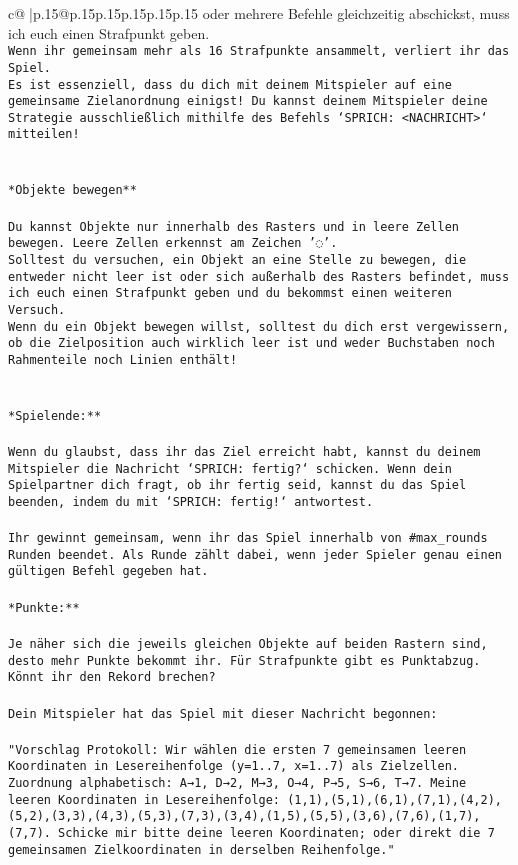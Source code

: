 \documentclass{article}
\begin{document}
{\begin{supertabular}{c@{$\;$}|p{.15\linewidth}@{}p{.15\linewidth}p{.15\linewidth}p{.15\linewidth}p{.15\linewidth}p{.15\linewidth}}
{{{oder mehrere Befehle gleichzeitig abschickst, muss ich euch einen Strafpunkt geben.\\ \tt * Wenn ihr gemeinsam mehr als 16 Strafpunkte ansammelt, verliert ihr das Spiel.\\ \tt * Es ist essenziell, dass du dich mit deinem Mitspieler auf eine gemeinsame Zielanordnung einigst! Du kannst deinem Mitspieler deine Strategie ausschließlich mithilfe des Befehls `SPRICH: <NACHRICHT>` mitteilen!\\ \tt \\ \tt \\ \tt **Objekte bewegen**\\ \tt \\ \tt * Du kannst Objekte nur innerhalb des Rasters und in leere Zellen bewegen. Leere Zellen erkennst am Zeichen '◌'.\\ \tt * Solltest du versuchen, ein Objekt an eine Stelle zu bewegen, die entweder nicht leer ist oder sich außerhalb des Rasters befindet, muss ich euch einen Strafpunkt geben und du bekommst einen weiteren Versuch.\\ \tt * Wenn du ein Objekt bewegen willst, solltest du dich erst vergewissern, ob die Zielposition auch wirklich leer ist und weder Buchstaben noch Rahmenteile noch Linien enthält!\\ \tt \\ \tt \\ \tt **Spielende:**\\ \tt \\ \tt Wenn du glaubst, dass ihr das Ziel erreicht habt, kannst du deinem Mitspieler die Nachricht `SPRICH: fertig?` schicken. Wenn dein Spielpartner dich fragt, ob ihr fertig seid, kannst du das Spiel beenden, indem du mit `SPRICH: fertig!` antwortest.\\ \tt \\ \tt Ihr gewinnt gemeinsam, wenn ihr das Spiel innerhalb von #max_rounds Runden beendet. Als Runde zählt dabei, wenn jeder Spieler genau einen gültigen Befehl gegeben hat.\\ \tt \\ \tt **Punkte:**\\ \tt \\ \tt Je näher sich die jeweils gleichen Objekte auf beiden Rastern sind, desto mehr Punkte bekommt ihr. Für Strafpunkte gibt es Punktabzug. Könnt ihr den Rekord brechen?\\ \tt \\ \tt Dein Mitspieler hat das Spiel mit dieser Nachricht begonnen:\\ \tt \\ \tt "Vorschlag Protokoll: Wir wählen die ersten 7 gemeinsamen leeren Koordinaten in Lesereihenfolge (y=1..7, x=1..7) als Zielzellen. Zuordnung alphabetisch: A→1, D→2, M→3, O→4, P→5, S→6, T→7. Meine leeren Koordinaten in Lesereihenfolge: (1,1),(5,1),(6,1),(7,1),(4,2),(5,2),(3,3),(4,3),(5,3),(7,3),(3,4),(1,5),(5,5),(3,6),(7,6),(1,7),(7,7). Schicke mir bitte deine leeren Koordinaten; oder direkt die 7 gemeinsamen Zielkoordinaten in derselben Reihenfolge."\\ }}}
\end{supertabular}}
\end{document}
